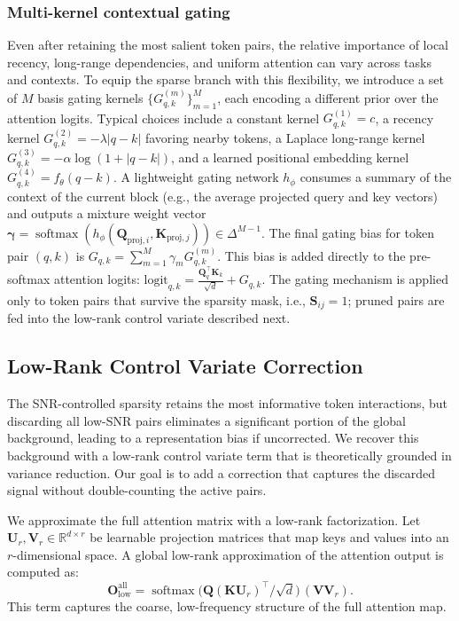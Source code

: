 \documentclass{article}
\begin{document}
\subsubsection{Multi-kernel contextual gating}
Even after retaining the most salient token pairs, the relative importance of local recency, long-range dependencies, and uniform attention can vary across tasks and contexts. To equip the sparse branch with this flexibility, we introduce a set of $M$ basis gating kernels $\{G^{(m)}_{q,k}\}_{m=1}^M$, each encoding a different prior over the attention logits. Typical choices include a constant kernel $G^{(1)}_{q,k} = c$, a recency kernel $G^{(2)}_{q,k} = -\lambda |q-k|$ favoring nearby tokens, a Laplace long-range kernel $G^{(3)}_{q,k} = -\alpha \log(1+|q-k|)$, and a learned positional embedding kernel $G^{(4)}_{q,k} = f_\theta(q-k)$. A lightweight gating network $h_\phi$ consumes a summary of the context of the current block (e.g., the average projected query and key vectors) and outputs a mixture weight vector $\boldsymbol{\gamma} = \operatorname{softmax}(h_\phi(\mathbf{Q}_{\text{proj},i},\mathbf{K}_{\text{proj},j})) \in \Delta^{M-1}$. The final gating bias for token pair $(q,k)$ is $G_{q,k} = \sum_{m=1}^M \gamma_m G^{(m)}_{q,k}$. This bias is added directly to the pre-softmax attention logits: $\text{logit}_{q,k} = \frac{\mathbf{Q}_q^{\top}\mathbf{K}_k}{\sqrt{d}} + G_{q,k}$. The gating mechanism is applied only to token pairs that survive the sparsity mask, i.e., $\mathbf{S}_{ij}=1$; pruned pairs are fed into the low-rank control variate described next.

\subsection{Low-Rank Control Variate Correction}

The SNR-controlled sparsity retains the most informative token interactions, but discarding all low-SNR pairs eliminates a significant portion of the global background, leading to a representation bias if uncorrected. We recover this background with a low-rank control variate term that is theoretically grounded in variance reduction. Our goal is to add a correction that captures the discarded signal without double-counting the active pairs. 

We approximate the full attention matrix with a low-rank factorization. Let $\mathbf{U}_r, \mathbf{V}_r \in \mathbb{R}^{d\times r}$ be learnable projection matrices that map keys and values into an $r$-dimensional space. A global low-rank approximation of the attention output is computed as:
\begin{equation}
    \mathbf{O}_{\text{low}}^{\text{all}} = \operatorname{softmax}\!\big(\mathbf{Q}(\mathbf{K}\mathbf{U}_r)^{\top}/\sqrt{d}\big) \, (\mathbf{V}\mathbf{V}_r).
\end{equation}
This term captures the coarse, low-frequency structure of the full attention map. 
\end{document}

